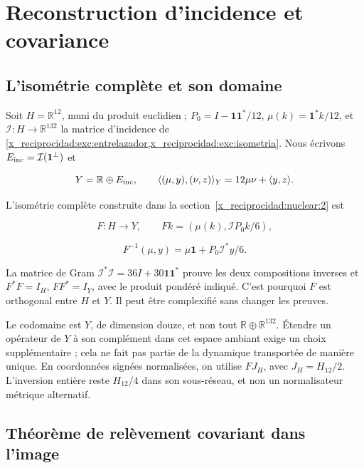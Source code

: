 \chapter{Reconstruction d’incidence et covariance}
\label{x_reciprocidad:nuclear:5}
\section{L’isométrie complète et son domaine}\label{x_reciprocidad:nuc05:isometria}

Soit \(H=\mathbb R^{12}\), muni du produit euclidien ; \(P_0=I-\mathbf1\mathbf1^*/12\), \(\mu(k)=\mathbf1^*k/12\), et \(\mathcal I:H\to\mathbb R^{132}\) la matrice d’incidence de \cref{x_reciprocidad:exc:entrelazador,x_reciprocidad:exc:isometria}. Nous écrivons \(E_{\rm inc}=\mathcal I(\mathbf1^\perp)\) et

\[
Y=\mathbb R\oplus E_{\rm inc},\qquad
\langle(\mu,y),(\nu,z)\rangle_Y=12\mu\nu+\langle y,z\rangle.
\]

L’isométrie complète construite dans la section~\ref{x_reciprocidad:nuclear:2} est

\[
F:H\longrightarrow Y,\qquad Fk=(\mu(k),\mathcal I P_0k/6),
\]

\[
F^{-1}(\mu,y)=\mu\mathbf1+P_0\mathcal I^*y/6.
\]

La matrice de Gram \(\mathcal I^*\mathcal I=36I+30\mathbf1\mathbf1^*\) prouve les deux compositions inverses et \(F^*F=I_H\), \(FF^*=I_Y\), avec le produit pondéré indiqué. C’est pourquoi \(F\) est orthogonal entre \(H\) et \(Y\). Il peut être complexifié sans changer les preuves.

Le codomaine est \(Y\), de dimension douze, et non tout \(\mathbb R\oplus\mathbb R^{132}\). Étendre un opérateur de \(Y\) à son complément dans cet espace ambiant exige un choix supplémentaire ; cela ne fait pas partie de la dynamique transportée de manière unique. En coordonnées signées normalisées, on utilise \(FJ_H\), avec \(J_H=H_{12}/2\). L’inversion entière reste \(H_{12}/4\) dans son sous-réseau, et non un normalisateur métrique alternatif.

\section{Théorème de relèvement covariant dans l’image}\label{x_reciprocidad:nuc05:levantamiento}

